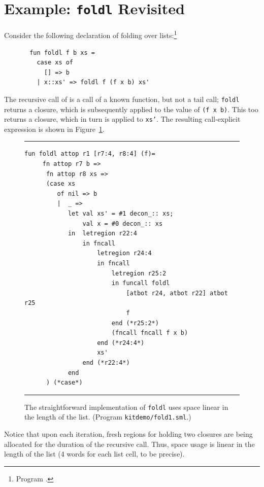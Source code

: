 \documentclass[12pt]{book}
\begin{document}
\section{Example: {\tt foldl}  Revisited}
\label{foldl.sec}
Consider the following declaration of folding over lists:\footnote{Program .}
\begin{verbatim}
       fun foldl f b xs = 
         case xs of 
           [] => b
         | x::xs' => foldl f (f x b) xs'
\end{verbatim}
The recursive call of  is a call of a known function, but not a tail
call; {\tt foldl} returns a closure, which is subsequently
applied to the value of {\tt (f x b)}. This too returns a closure,
which in turn is applied to {\tt xs'}. 
The resulting call-explicit expression is shown in Figure~\ref{fold1.fig}.
\begin{figure}
\hrule \medskip
\begin{verbatim}
fun foldl attop r1 [r7:4, r8:4] (f)= 
     fn attop r7 b => 
      fn attop r8 xs => 
      (case xs 
         of nil => b
         |  _ => 
            let val xs' = #1 decon_:: xs; 
                val x = #0 decon_:: xs
            in  letregion r22:4 
                in fncall 
                    letregion r24:4 
                    in fncall 
                        letregion r25:2 
                        in funcall foldl
                            [atbot r24, atbot r22] atbot r25 
                            f 
                        end (*r25:2*) 
                        (fncall fncall f x b) 
                    end (*r24:4*) 
                    xs' 
                end (*r22:4*)
            end 
      ) (*case*) 
\end{verbatim}
\caption{The straightforward implementation of {\tt foldl} uses space linear in the length of the list. (Program {\tt kitdemo/fold1.sml}.)}
\medskip \hrule \label{fold1.fig}
\end{figure}
Notice that upon each iteration, fresh regions for holding
two closures are being allocated for the duration of the
recursive call. Thus, space usage is linear in the length 
of the list (4 words for each list cell, to be precise).
\end{document}
